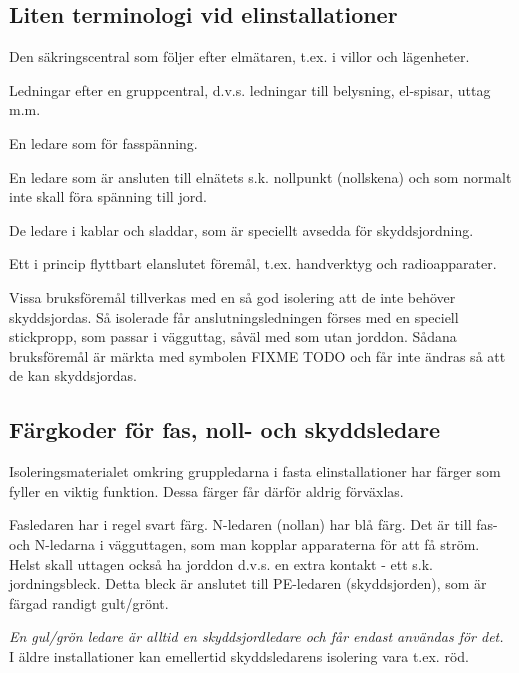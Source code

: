 \subsection{Liten terminologi vid elinstallationer}
\begin{description}[style=nextline]
\item[Gruppcentral] Den säkringscentral som följer efter elmätaren,
  t.ex. i villor och lägenheter.
\item [Gruppledningar] Ledningar efter en gruppcentral, d.v.s.
  ledningar till belysning, el-spisar, uttag m.m.
\item[Fasledare] En ledare som för fasspänning.
\item[Nolledare (N-ledare)] En ledare som är ansluten till elnätets
  s.k.  nollpunkt (nollskena) och som normalt inte skall föra spänning
  till jord.
\item[Skyddsledare (PE-Iedare)] De ledare i kablar och sladdar, som är
  speciellt avsedda för skyddsjordning.
\item[Bruksföremål] Ett i princip flyttbart elanslutet föremål,
  t.ex. handverktyg och radioapparater.
\item[Förstärkt isolering] Vissa bruksföremål tillverkas med en så god
  isolering att de inte behöver skyddsjordas. Så isolerade får
  anslutningsledningen förses med en speciell stickpropp, som passar i
  vägguttag, såväl med som utan jorddon. Sådana bruksföremål är märkta
  med symbolen FIXME TODO och får inte ändras så att de kan skyddsjordas.
\end{description}

\subsection{Färgkoder för fas, noll- och skyddsledare}

Isoleringsmaterialet omkring gruppledarna i fasta elinstallationer har
färger som fyller en viktig funktion. Dessa färger får därför aldrig
förväxlas.

Fasledaren har i regel svart färg. N-ledaren (nollan) har blå färg.
Det är till fas- och N-ledarna i vägguttagen, som man kopplar
apparaterna för att få ström. Helst skall uttagen också ha jorddon
d.v.s. en extra kontakt - ett s.k. jordningsbleck. Detta bleck är
anslutet till PE-ledaren (skyddsjorden), som är färgad randigt
gult/grönt.

\emph{En gul/grön ledare är alltid en skyddsjordledare och får endast
  användas för det.} I äldre installationer kan emellertid
skyddsledarens isolering vara t.ex. röd.


